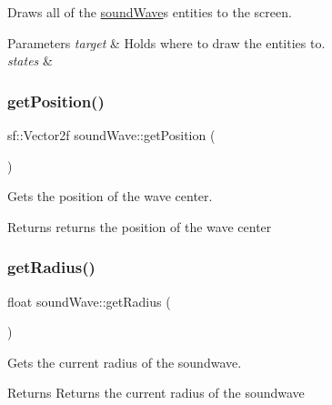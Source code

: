 Draws all of the \hyperlink{classsound_wave}{sound\+Wave}\textquotesingle{}s entities to the screen. 


\begin{DoxyParams}{Parameters}
{\em target} & Holds where to draw the entities to. \\
\hline
{\em states} & \\
\hline
\end{DoxyParams}
\mbox{\label{classsound_wave_a46398f66c54a2868cf482b9a641e3770}} 
\subsubsection{\texorpdfstring{get\+Position()}{getPosition()}}
{\footnotesize\ttfamily sf\+::\+Vector2f sound\+Wave\+::get\+Position (\begin{DoxyParamCaption}{ }\end{DoxyParamCaption})}



Gets the position of the wave center. 

\begin{DoxyReturn}{Returns}
returns the position of the wave center 
\end{DoxyReturn}
\mbox{\label{classsound_wave_a1ef817617f2b8f7d69d0f2c2378a295a}} 
\subsubsection{\texorpdfstring{get\+Radius()}{getRadius()}}
{\footnotesize\ttfamily float sound\+Wave\+::get\+Radius (\begin{DoxyParamCaption}{ }\end{DoxyParamCaption})}



Gets the current radius of the soundwave. 

\begin{DoxyReturn}{Returns}
Returns the current radius of the soundwave 
\end{DoxyReturn}
\mbox{\label{classsound_wave_ae5709a35ac2c7772ddf41869ce2bb097}} 
